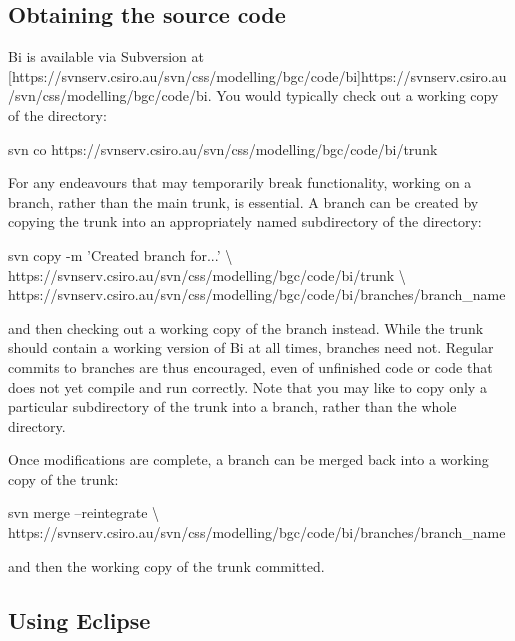 \subsection{Obtaining the source code}

Bi is available via Subversion at
\hyperref[hyper][https://svnserv.csiro.au/svn/css/modelling/bgc/code/bi]{https://svnserv.csiro.au/svn/css/modelling/bgc/code/bi}. You
would typically check out a working copy of the  directory:
\begin{cmdcode}
svn co https://svnserv.csiro.au/svn/css/modelling/bgc/code/bi/trunk
\end{cmdcode}

For any endeavours that may temporarily break functionality, working on a
branch, rather than the main trunk, is essential. A branch can be created by
copying the trunk into an appropriately named subdirectory of the
 directory:
\begin{cmdcode}
svn copy -m 'Created branch for...' \textbackslash
  https://svnserv.csiro.au/svn/css/modelling/bgc/code/bi/trunk \textbackslash
  https://svnserv.csiro.au/svn/css/modelling/bgc/code/bi/branches/branch_name
\end{cmdcode}
and then checking out a working copy of the branch instead. While the trunk
should contain a working version of Bi at all times, branches need
not. Regular commits to branches are thus encouraged, even of unfinished code
or code that does not yet compile and run correctly. Note that you may like to
copy only a particular subdirectory of the trunk into a branch, rather than
the whole directory.

Once modifications are complete, a branch can be merged back into a working
copy of the trunk:
\begin{cmdcode}
svn merge --reintegrate \textbackslash
  https://svnserv.csiro.au/svn/css/modelling/bgc/code/bi/branches/branch_name
\end{cmdcode}
and then the working copy of the trunk committed.

\subsection{Using Eclipse\label{Using_Eclipse}}

